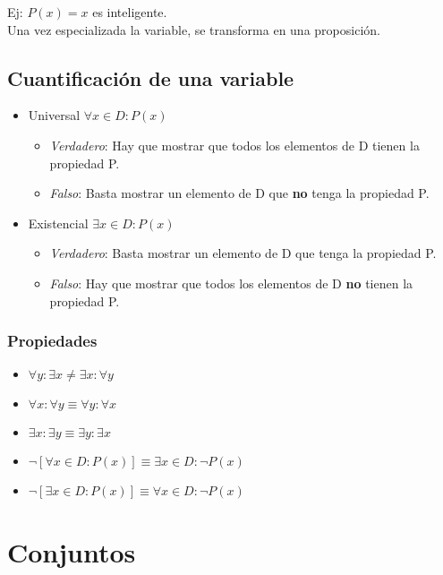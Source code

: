 \documentclass[a4paper, twoside]{article}
\begin{document}
Ej: $P(x) = x$ es inteligente.\\

Una vez especializada la variable, se transforma en una proposición.

\subsection{Cuantificación de una variable}
\begin{itemize}
	\item Universal $\forall x \in D: P(x)$
		\begin{itemize}
			\item \emph{Verdadero}: Hay que mostrar que todos los elementos de D tienen la propiedad P.
			\item \emph{Falso}: Basta mostrar un elemento de D que \textbf{no} tenga la propiedad P.
		\end{itemize}
	
	\item Existencial $\exists x \in D: P(x)$
		\begin{itemize}
			\item \emph{Verdadero}: Basta mostrar un elemento de D que tenga la propiedad P.
			\item \emph{Falso}: Hay que mostrar que todos los elementos de D \textbf{no} tienen la propiedad P.
		\end{itemize}
\end{itemize}

\subsubsection{Propiedades}
\begin{itemize}
	\item $\forall y: \exists x \neq \exists x: \forall y$
	\item $\forall x: \forall y \equiv \forall y: \forall x$
	\item $\exists x: \exists y \equiv \exists y: \exists x$
	\item $\neg\left[\forall x \in D: P(x)\right] \equiv \exists x \in D: \neg P(x)$
	\item $\neg\left[\exists x \in D: P(x)\right] \equiv \forall x \in D: \neg P(x)$
\end{itemize}

\newpage
\section{Conjuntos}
\end{document}
